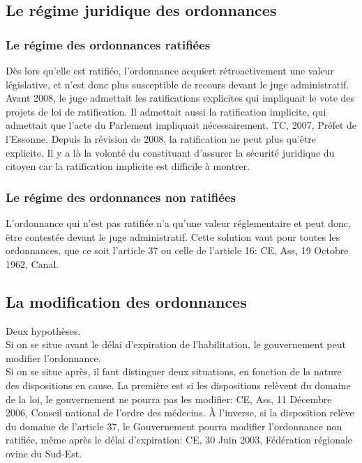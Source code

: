 \documentclass[10pt, a4paper, openany]{book}
\begin{document}
\subsection{Le régime juridique des ordonnances}

\subsubsection{Le régime des ordonnances ratifiées}

Dès lors qu'elle est ratifiée, l'ordonnance acquiert rétroactivement une valeur législative, et n'est donc plus susceptible de recours devant le juge administratif. \\
Avant 2008, le juge admettait les ratifications explicites qui impliquait le vote des projets de loi de ratification. Il admettait aussi la ratification implicite, qui admettait que l'acte du Parlement impliquait nécessairement. TC, 2007, Préfet de l'Essonne. Depuis la révision de 2008, la ratification ne peut plus qu'être explicite. Il y a là la volonté du constituant d'assurer la sécurité juridique du citoyen car la ratification implicite est difficile à montrer. 

\subsubsection{Le régime des ordonnances non ratifiées}

L'ordonnance qui n'est pas ratifiée n'a qu'une valeur réglementaire et peut donc, être contestée devant le juge administratif. Cette solution vaut pour toutes les ordonnances, que ce soit l'article 37 ou celle de l'article 16: CE, Ass, 19 Octobre 1962, Canal. 

\subsection{La modification des ordonnances}

Deux hypothèses. \\
Si on se situe avant le délai d'expiration de l'habilitation, le gouvernement peut modifier l'ordonnance. \\
Si on se situe après, il faut distinguer deux situations, en fonction de la nature des dispositions en cause. La première est si les dispositions relèvent du domaine de la loi, le gouvernement ne pourra pas les modifier: CE, Ass, 11 Décembre 2006, Conseil national de l'ordre des médecins. À l'inverse, si la disposition relève du domaine de l'article 37, le Gouvernement pourra modifier l'ordonnance non ratifiée, même après le délai d'expiration: CE, 30 Juin 2003, Fédération régionale ovine du Sud-Est. 
\end{document}

